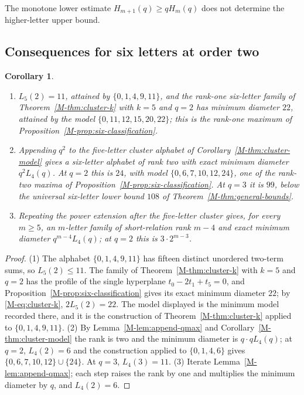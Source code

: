 \documentclass[11pt,reqno]{amsart}
\theoremstyle{plain}
\newtheorem{corollary}[theorem]{Corollary}
\theoremstyle{definition}
\theoremstyle{plain}
\theoremstyle{plain}
\theoremstyle{plain}
\theoremstyle{plain}
\theoremstyle{plain}
\theoremstyle{plain}
\theoremstyle{definition}
\theoremstyle{definition}
\theoremstyle{definition}
\theoremstyle{plain}
\begin{document}
The monotone lower estimate $H_{m+1}(q)\ge qH_m(q)$ does not determine the
higher-letter upper bound.

\subsection{Consequences for six letters at order two}
\begin{corollary}\label{M-cor:six-explanations}
\leavevmode
\begin{enumerate}
\item $L_5(2)=11$, attained by $\{0,1,4,9,11\}$, and the rank-one
 six-letter family of Theorem~\ref{M-thm:cluster-k} with $k=5$ and $q=2$
 has minimum diameter $22$, attained by the model
 $\{0,11,12,15,20,22\}$; this is the rank-one maximum of
 Proposition~\ref{M-prop:six-classification}.
\item Appending $q^2$ to the five-letter cluster alphabet of
 Corollary~\ref{M-thm:cluster-model} gives a six-letter alphabet of rank two
 with exact minimum diameter $q^2L_4(q)$. At $q=2$ this is $24$, with model
 $\{0,6,7,10,12,24\}$, one of the rank-two maxima of
 Proposition~\ref{M-prop:six-classification}. At $q=3$ it is $99$, below the
 universal six-letter lower bound $108$ of Theorem~\ref{M-thm:general-bounds}.
\item Repeating the power extension after the five-letter cluster gives, for
 every $m\ge5$, an $m$-letter family of short-relation rank $m-4$ and exact
 minimum diameter $q^{m-4}L_4(q)$; at $q=2$ this is $3\cdot2^{m-3}$.
\end{enumerate}
\end{corollary}
\begin{proof}
(1) The alphabet $\{0,1,4,9,11\}$ has fifteen distinct unordered two-term
sums, so $L_5(2)\le11$. The family of Theorem~\ref{M-thm:cluster-k} with
$k=5$ and $q=2$ has the profile of the single hyperplane
$t_0-2t_1+t_5=0$, and Proposition~\ref{M-prop:six-classification} gives its
exact minimum diameter $22$; by \eqref{M-eq:cluster-k}, $2L_5(2)=22$. The
model displayed is the minimum model recorded there, and it is the
construction of Theorem~\ref{M-thm:cluster-k} applied to $\{0,1,4,9,11\}$.
(2) By Lemma~\ref{M-lem:append-qmax} and Corollary~\ref{M-thm:cluster-model} the
rank is two and the minimum diameter is $q\cdot qL_4(q)$; at $q=2$,
$L_4(2)=6$ and the construction applied to $\{0,1,4,6\}$ gives
$\{0,6,7,10,12\}\cup\{24\}$. At $q=3$, $L_4(3)=11$.
(3) Iterate Lemma~\ref{M-lem:append-qmax}; each step raises the rank by one
and multiplies the minimum diameter by $q$, and $L_4(2)=6$.
\end{proof}
\end{document}
